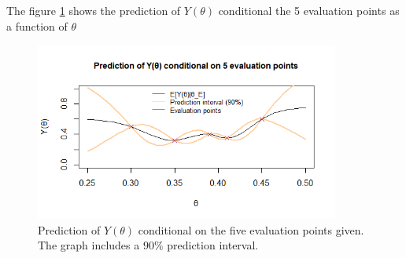 The figure \ref{2afiveeval} shows the prediction of $Y(\theta)$ conditional the 5 evaluation points as a function of $\theta$ 

\begin{figure}
    \centering
    \includegraphics[width=100mm]{2anew.png}
    \caption{Prediction of $Y(\theta)$ conditional on the five evaluation points given. The graph includes a $90\%$ prediction interval. }
    \label{2afiveeval}
\end{figure}

